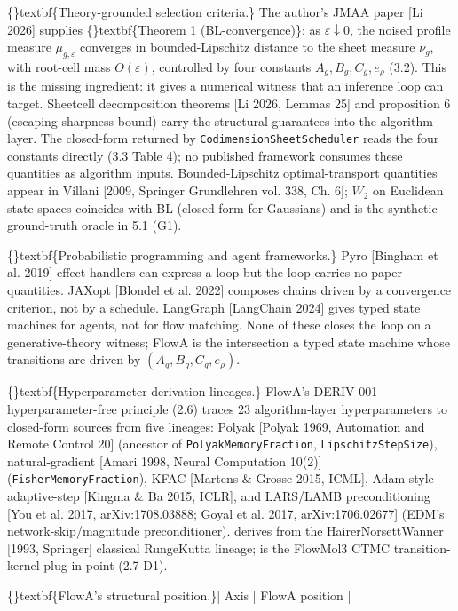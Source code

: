 \documentclass{article}
\begin{document}
\{\}textbf\{Theory-grounded selection criteria.\} The author's JMAA paper [Li 2026] supplies \{\}textbf\{Theorem 1 (BL-convergence)\}: as $\varepsilon \downarrow 0$, the noised profile measure $\mu_{g,\varepsilon}$ converges in bounded-Lipschitz distance to the sheet measure $\nu_g$, with root-cell mass $O(\varepsilon)$, controlled by four constants $A_g, B_g, C_g, e_\rho$ (3.2). This is the missing ingredient: it gives a numerical witness  that an inference loop can target. Sheetcell decomposition theorems [Li 2026, Lemmas 25] and proposition 6 (escaping-sharpness bound) carry the structural guarantees into the algorithm layer. The closed-form  returned by \texttt{CodimensionSheetScheduler} reads the four constants directly (3.3 Table 4); no published framework consumes these quantities as algorithm inputs. Bounded-Lipschitz optimal-transport quantities appear in Villani [2009, Springer Grundlehren vol. 338, Ch. 6]; $W_2$ on Euclidean state spaces coincides with BL (closed form for Gaussians) and is the synthetic-ground-truth oracle in 5.1 (G1).

\{\}textbf\{Probabilistic programming and agent frameworks.\} Pyro [Bingham et al. 2019] effect handlers can express a loop but the loop carries no paper quantities. JAXopt [Blondel et al. 2022] composes chains driven by a convergence criterion, not by a schedule. LangGraph [LangChain 2024] gives typed state machines for agents, not for flow matching. None of these closes the loop on a generative-theory witness; FlowA is the intersection  a typed state machine whose transitions are driven by $(A_g, B_g, C_g, e_\rho)$.

\{\}textbf\{Hyperparameter-derivation lineages.\} FlowA's DERIV-001 hyperparameter-free principle (2.6) traces 23 algorithm-layer hyperparameters to closed-form sources from five lineages: Polyak [Polyak 1969, Automation and Remote Control 20] (ancestor of \texttt{PolyakMemoryFraction}, \texttt{LipschitzStepSize}), natural-gradient [Amari 1998, Neural Computation 10(2)] (\texttt{FisherMemoryFraction}), KFAC [Martens \& Grosse 2015, ICML], Adam-style adaptive-step [Kingma \& Ba 2015, ICLR], and LARS/LAMB preconditioning [You et al. 2017, arXiv:1708.03888; Goyal et al. 2017, arXiv:1706.02677] (EDM's network-skip/magnitude preconditioner).  derives from the HairerNorsettWanner [1993, Springer] classical RungeKutta lineage;  is the FlowMol3 CTMC transition-kernel plug-in point (2.7 D1).

\{\}textbf\{FlowA's structural position.\}| Axis | FlowA position |
\end{document}
